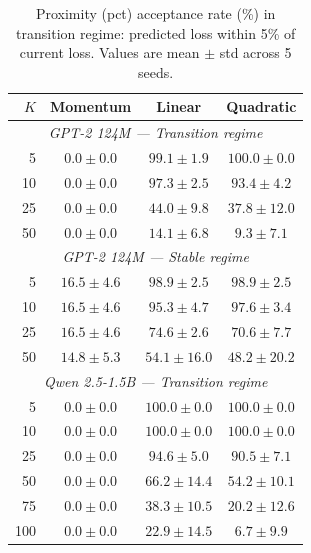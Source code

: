 \documentclass{article}
\begin{document}
\begin{table}[h]
\centering
\caption{Proximity (pct) acceptance rate (\%) in transition regime: predicted loss within 5\% of current loss.
Values are mean $\pm$ std across 5 seeds.
}
\label{tab:pct}
\begin{tabular}{r|ccc}
\toprule
$K$ & Momentum & Linear & Quadratic \\
\midrule
\multicolumn{4}{c}{\textit{GPT-2 124M --- Transition regime}} \\
\midrule
5   & $0.0 \pm 0.0$ & $99.1 \pm 1.9$ & $100.0 \pm 0.0$  \\
10  & $0.0 \pm 0.0$ & $97.3 \pm 2.5$  & $93.4 \pm 4.2$   \\
25  & $0.0 \pm 0.0$ & $44.0 \pm 9.8$  & $37.8 \pm 12.0$  \\
50  & $0.0 \pm 0.0$ & $14.1 \pm 6.8$  & $9.3 \pm 7.1$    \\
\midrule
\multicolumn{4}{c}{\textit{GPT-2 124M --- Stable regime}} \\
\midrule
5   & $16.5 \pm 4.6$ & $98.9 \pm 2.5$  & $98.9 \pm 2.5$  \\
10  & $16.5 \pm 4.6$ & $95.3 \pm 4.7$  & $97.6 \pm 3.4$  \\
25  & $16.5 \pm 4.6$ & $74.6 \pm 2.6$  & $70.6 \pm 7.7$  \\
50  & $14.8 \pm 5.3$ & $54.1 \pm 16.0$ & $48.2 \pm 20.2$ \\
\midrule
\multicolumn{4}{c}{\textit{Qwen 2.5-1.5B --- Transition regime}} \\
\midrule
5   & $0.0 \pm 0.0$ & $100.0 \pm 0.0$  & $100.0 \pm 0.0$  \\
10  & $0.0 \pm 0.0$ & $100.0 \pm 0.0$  & $100.0 \pm 0.0$  \\
25  & $0.0 \pm 0.0$ & $94.6 \pm 5.0$   & $90.5 \pm 7.1$   \\
50  & $0.0 \pm 0.0$ & $66.2 \pm 14.4$  & $54.2 \pm 10.1$  \\
75  & $0.0 \pm 0.0$ & $38.3 \pm 10.5$  & $20.2 \pm 12.6$  \\
100 & $0.0 \pm 0.0$ & $22.9 \pm 14.5$  & $6.7 \pm 9.9$    \\
\bottomrule
\end{tabular}
\end{table}
\end{document}
